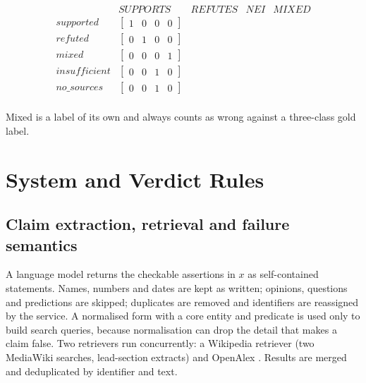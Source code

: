 \documentclass[11pt,a4paper]{article}
\begin{document}
\begin{table}[t]
\centering
\[\begin{array}{lcccc}
 & \mathit{SUPPORTS} & \mathit{REFUTES} & \mathit{NEI} & \mathit{MIXED} \\
\mathit{supported} & \left[\begin{matrix} 1 & 0 & 0 & 0 \end{matrix}\right] \\
\mathit{refuted} & \left[\begin{matrix} 0 & 1 & 0 & 0 \end{matrix}\right] \\
\mathit{mixed} & \left[\begin{matrix} 0 & 0 & 0 & 1 \end{matrix}\right] \\
\mathit{insufficient} & \left[\begin{matrix} 0 & 0 & 1 & 0 \end{matrix}\right] \\
\mathit{no\_sources} & \left[\begin{matrix} 0 & 0 & 1 & 0 \end{matrix}\right] \\
\end{array}\]
\caption{Mapping $\Phi$ from verdicts to labels.}
\par{\scriptsize Mixed is a label of its own and always counts as wrong against a three-class gold label.}
\end{table}

\section{System and Verdict Rules}

\subsection{Claim extraction, retrieval and failure semantics}

A language model returns the checkable assertions in $x$ as self-contained statements. Names, numbers and dates are kept as written; opinions, questions and predictions are skipped; duplicates are removed and identifiers are reassigned by the service. A normalised form with a core entity and predicate is used only to build search queries, because normalisation can drop the detail that makes a claim false. Two retrievers run concurrently: a Wikipedia retriever (two MediaWiki searches, lead-section extracts) and OpenAlex \citep{priem2022}. Results are merged and deduplicated by identifier and text.
\end{document}
